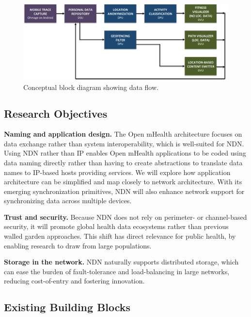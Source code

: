 \begin{figure}
\begin{center}
\includegraphics[width=1\textwidth]{figures/ConceptualBlock}
\caption{Conceptual block diagram showing data flow.}
\label{fig:ConceptualBlock}
\end{center}
\end{figure}


\subsection{Research Objectives} 

{\bf Naming and application design.} The Open mHealth architecture focuses on data exchange rather than system interoperability, which is well-suited for NDN. Using NDN rather than IP enables Open mHealth applications to be coded using data naming directly rather than having to create abstractions to translate data names to IP-based hosts providing services. We will explore how application architecture can be simplified and map closely to network architecture. With its emerging synchronization primitives, NDN will also enhance network support for synchronizing data across multiple devices. 

{\bf Trust and security.} Because NDN does not rely on perimeter- or channel-based security, it will promote global health data ecosystems rather than previous walled garden approaches.   This shift has direct relevance for public health, by enabling research to draw from large populations. 

{\bf Storage in the network.} NDN naturally supports distributed storage, which can ease the burden of fault-tolerance and load-balancing in large networks, reducing cost-of-entry and fostering innovation. 


\subsection{Existing Building Blocks} 

